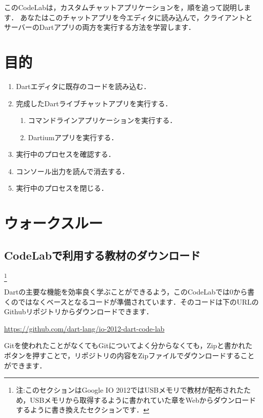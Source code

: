 
このCodeLabは，カスタムチャットアプリケーションを，順を追って説明します．
あなたはこのチャットアプリを今エディタに読み込んで，クライアントとサーバーのDartアプリの両方を実行する方法を学習します．

\section{目的}

\begin{enumerate}
\item Dartエディタに既存のコードを読み込む．
\item 完成したDartライブチャットアプリを実行する．
\begin{enumerate}
\item コマンドラインアプリケーションを実行する．
\item Dartiumアプリを実行する．
\end{enumerate}
\item 実行中のプロセスを確認する．
\item コンソール出力を読んで消去する．
\item 実行中のプロセスを閉じる．
\end{enumerate}

\section{ウォークスルー}

\subsection{CodeLabで利用する教材のダウンロード}\footnote{注:このセクションはGoogle IO 2012ではUSBメモリで教材が配布されたため，USBメモリから取得するように書かれていた章をWebからダウンロードするように書き換えたセクションです．}

Dartの主要な機能を効率良く学ぶことができるよう，このCodeLabでは0から書くのではなくベースとなるコードが準備されています．そのコードは下のURLのGithubリポジトリからダウンロードできます．

\vspace{5mm}
\url{https://github.com/dart-lang/io-2012-dart-code-lab}
\vspace{5mm}

Gitを使われたことがなくてもGitについてよく分からなくても，Zipと書かれたボタンを押すことで，リポジトリの内容をZipファイルでダウンロードすることができます．

